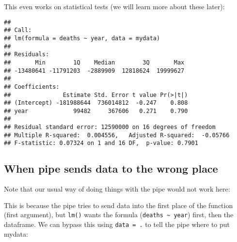 \documentclass[]{book}
\makeatletter
\newenvironment{Shaded}{\begin{snugshade}}{\end{snugshade}}
\newcommand{\KeywordTok}[1]{\textcolor[rgb]{0.13,0.29,0.53}{\textbf{#1}}}
\newcommand{\DataTypeTok}[1]{\textcolor[rgb]{0.13,0.29,0.53}{#1}}
\newcommand{\StringTok}[1]{\textcolor[rgb]{0.31,0.60,0.02}{#1}}
\newcommand{\CommentTok}[1]{\textcolor[rgb]{0.56,0.35,0.01}{\textit{#1}}}
\newcommand{\OperatorTok}[1]{\textcolor[rgb]{0.81,0.36,0.00}{\textbf{#1}}}
\newcommand{\NormalTok}[1]{#1}
\newenvironment{kframe}{%
\medskip{}
\setlength{\fboxsep}{.8em}
 \def\at@end@of@kframe{}%
 \ifinner\ifhmode%
  \def\at@end@of@kframe{\end{minipage}}%
  \begin{minipage}{\columnwidth}%
 \fi\fi%
 \def\FrameCommand##1{\hskip\@totalleftmargin \hskip-\fboxsep
 \colorbox{shadecolor}{##1}\hskip-\fboxsep
     \hskip-\linewidth \hskip-\@totalleftmargin \hskip\columnwidth}%
 \MakeFramed {\advance\hsize-\width
   \@totalleftmargin\z@ \linewidth\hsize
   \@setminipage}}%
 {\par\unskip\endMakeFramed%
 \at@end@of@kframe}
\renewenvironment{Shaded}{\begin{kframe}}{\end{kframe}}
\theoremstyle{definition}
\theoremstyle{definition}
\theoremstyle{definition}
\theoremstyle{remark}
\makeatother
\begin{document}
This even works on statistical tests (we will learn more about these
later):

\begin{Shaded}
\end{Shaded}

\begin{verbatim}
## 
## Call:
## lm(formula = deaths ~ year, data = mydata)
## 
## Residuals:
##       Min        1Q    Median        3Q       Max 
## -13480641 -11791203  -2889909  12818624  19999627 
## 
## Coefficients:
##               Estimate Std. Error t value Pr(>|t|)
## (Intercept) -181988644  736014812  -0.247    0.808
## year             99482     367606   0.271    0.790
## 
## Residual standard error: 12590000 on 16 degrees of freedom
## Multiple R-squared:  0.004556,   Adjusted R-squared:  -0.05766 
## F-statistic: 0.07324 on 1 and 16 DF,  p-value: 0.7901
\end{verbatim}

\subsection{When pipe sends data to the wrong
place}\label{when-pipe-sends-data-to-the-wrong-place}

Note that our usual way of doing things with the pipe would not work
here:

\begin{Shaded}
\end{Shaded}

This is because the pipe tries to send data into the first place of the
function (first argument), but \texttt{lm()} wants the formula
(\texttt{deaths\ \textasciitilde{}\ year}) first, then the dataframe. We
can bypass this using \texttt{data\ =\ .} to tell the pipe where to put
mydata:

\begin{Shaded}
\end{Shaded}
\end{document}
